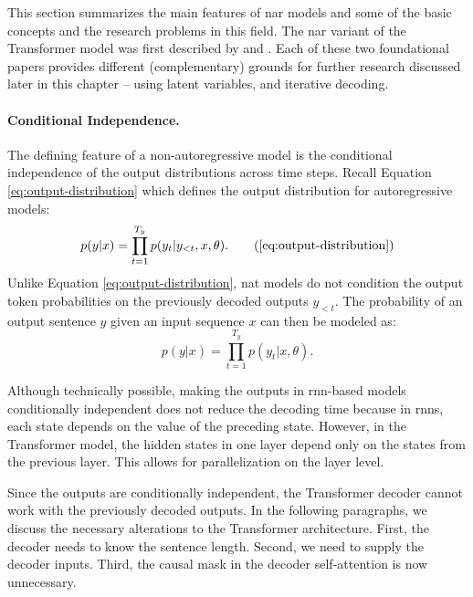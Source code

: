 This section summarizes the main features of \ac{nar} models and some of the
basic concepts and the research problems in this field. The \ac{nar} variant of
the Transformer model was first described by \citet{gu2017nonautoregressive}
and \citet{lee-etal-2018-deterministic}. Each of these two foundational papers
provides different (complementary) grounds for further research discussed later
in this chapter -- using latent variables, and iterative decoding.

\paragraph{Conditional Independence.} The defining feature of a
non-autoregressive model is the conditional independence of the output
distributions across time steps. Recall Equation \ref{eq:output-distribution}
which defines the output distribution for autoregressive models:
%
\begin{equation*}
  p(y|x) = \prod_{t=1}^{T_y}p(y_t|y_{<t},x,\theta).
  \tag{\ref{eq:output-distribution}}
\end{equation*}
%
Unlike Equation \ref{eq:output-distribution}, \Ac{nat} models do not condition
the output token probabilities on the previously decoded outputs $y_{<t}$.  The
probability of an output sentence $y$ given an input sequence $x$ can then be
modeled as:
%
\begin{equation}
  p(y|x) = \prod_{t=1}^{T_y}p(y_t|x,\theta).
  \label{eq:nat-output-distribution}
\end{equation}

Although technically possible, making the outputs in \acs{rnn}-based models
conditionally independent does not reduce the decoding time because in
\acsp{rnn}, each state depends on the value of the preceding state. However, in
the Transformer model, the hidden states in one layer depend only on the states
from the previous layer. This allows for parallelization on the layer level.

Since the outputs are conditionally independent, the Transformer decoder cannot
work with the previously decoded outputs. In the following paragraphs, we
discuss the necessary alterations to the Transformer architecture.  First, the
decoder needs to know the sentence length. Second, we need to supply the
decoder inputs. Third, the causal mask in the decoder self-attention is now
unnecessary.

